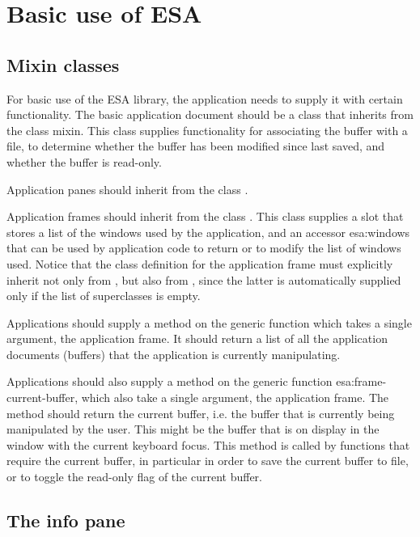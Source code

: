 \chapter{Basic use of ESA}

\section{Mixin classes}

For basic use of the ESA library, the application needs to supply it
with certain functionality.  The basic application document should be a
class that inherits from the class  mixin.
This class supplies functionality for associating the buffer with a
file, to determine whether the buffer has been modified since last
saved, and whether the buffer is read-only.

Application panes should inherit from the class
.

Application frames should inherit from the class
.  This class supplies a slot that stores a
list of the windows used by the application, and an accessor esa:windows
that can be used by application code to return or to modify the list of
windows used.  Notice that the class definition for the application
frame must explicitly inherit not only from , but
also from , since the latter is
automatically supplied only if the list of superclasses is empty.

Applications should supply a method on the generic function
 which takes a single argument, the application frame.
It should return a list of all the application documents (buffers) that
the application is currently manipulating.

Applications should also supply a method on the generic function
esa:frame-current-buffer, which also take a single argument, the
application frame.  The method should return the current buffer,
i.e. the buffer that is currently being manipulated by the user.  This
might be the buffer that is on display in the window with the current
keyboard focus.  This method is called by functions that require the
current buffer, in particular in order to save the current buffer to
file, or to toggle the read-only flag of the current buffer.  

\section{The info pane}

